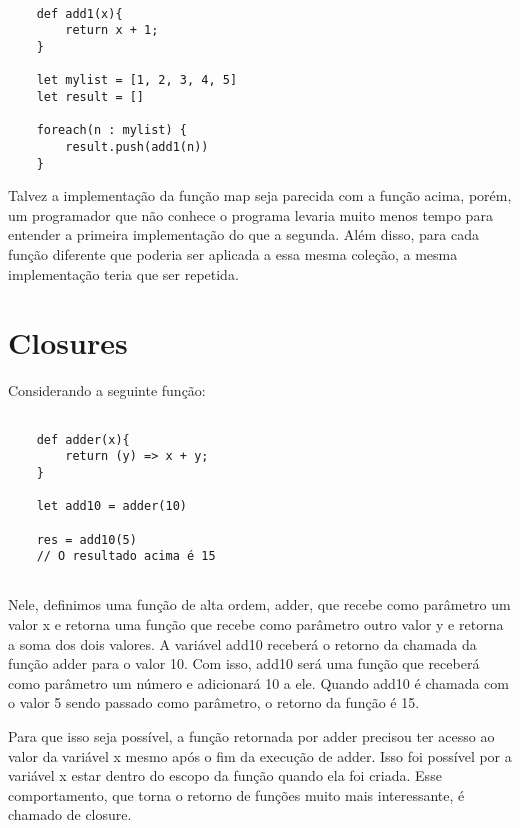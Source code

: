 \begin{lstlisting}[caption={Exemplo sem Funções de Alta Ordem},label=nohof]

    def add1(x){
        return x + 1;
    }

    let mylist = [1, 2, 3, 4, 5]
    let result = []

    foreach(n : mylist) {
        result.push(add1(n))
    }

\end{lstlisting}

Talvez a implementação da função map seja parecida 
com a função acima, porém, um programador que não 
conhece o programa levaria muito menos tempo para 
entender a primeira implementação do que a segunda. 
Além disso, para cada função diferente que poderia 
ser aplicada a essa mesma coleção, a mesma 
implementação teria que ser repetida.


\section{Closures}

Considerando a seguinte função:

\begin{lstlisting}[caption={Exemplo de Closure},label=closureex]

    def adder(x){
        return (y) => x + y;
    }

    let add10 = adder(10)

    res = add10(5)
    // O resultado acima é 15


\end{lstlisting}

Nele, definimos uma função de alta ordem, adder, que 
recebe como parâmetro um valor x e retorna uma função 
que recebe como parâmetro outro valor y e retorna a 
soma dos dois valores. A variável add10 receberá 
o retorno da chamada da função adder para o valor 10. 
Com isso, add10 será uma função que receberá como 
parâmetro um número e adicionará 10 a ele. Quando 
add10 é chamada com o valor 5 sendo passado como 
parâmetro, o retorno da função é 15.

Para que isso seja possível, a função retornada por 
adder precisou ter acesso ao valor da variável x mesmo 
após o fim da execução de adder. Isso foi possível 
por a variável x estar dentro do escopo da função 
quando ela foi criada. Esse comportamento, que torna 
o retorno de funções muito mais interessante, é chamado 
de closure. \cite{mflambdas}


